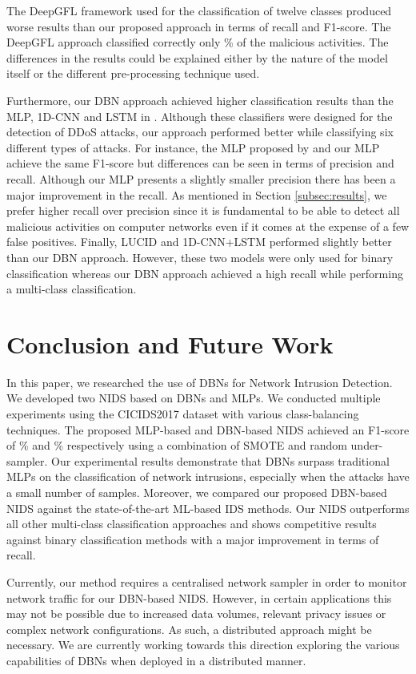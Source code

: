 \documentclass[runningheads]{llncs}
\begin{document}
The DeepGFL \cite{DeepGFL} framework used for the classification of twelve classes produced worse results than our proposed approach in terms of recall and F1-score. The DeepGFL approach classified correctly only \% of the malicious activities. The differences in the results could be explained either by the nature of the model itself or the different pre-processing technique used.

Furthermore, our \ac{DBN} approach achieved higher classification results than the \ac{MLP}, 1D-\ac{CNN} and LSTM in \cite{1D-CNN-LSTM}. Although these classifiers were designed for the detection of \ac{DDoS} attacks, our approach performed better while classifying six different types of attacks. For instance, the \ac{MLP} proposed by \cite{1D-CNN-LSTM} and our \ac{MLP} achieve the same F1-score but differences can be seen in terms of precision and recall. Although our \ac{MLP} presents a slightly smaller precision there has been a major improvement in the recall. As mentioned in Section \ref{subsec:results}, we prefer higher recall over precision since it is fundamental to be able to detect all malicious activities on computer networks even if it comes at the expense of a few false positives.
Finally, LUCID \cite{LUCID} and 1D-\ac{CNN}+LSTM \cite{1D-CNN-LSTM} performed slightly better than our \ac{DBN} approach. However, these two models were only used for binary classification whereas our \ac{DBN} approach achieved a high recall while performing a multi-class classification. \section{Conclusion and Future Work}
\label{sec:conclusion}

In this paper, we researched the use of \acp{DBN} for Network Intrusion Detection. We developed two \ac{NIDS} based on \acp{DBN} and \acp{MLP}. We conducted multiple experiments using the CICIDS2017 dataset with various class-balancing techniques. The proposed \ac{MLP}-based and \ac{DBN}-based \ac{NIDS} achieved an F1-score of \% and \% respectively using a combination of \ac{SMOTE} and random under-sampler. Our experimental results demonstrate that \acp{DBN} surpass traditional \acp{MLP} on the classification of network intrusions, especially when the attacks have a small number of samples. Moreover, we compared our proposed \ac{DBN}-based \ac{NIDS} against the state-of-the-art ML-based IDS methods. Our \ac{NIDS} outperforms all other multi-class classification approaches and shows competitive results against binary classification methods with a major improvement in terms of recall. 

Currently, our method requires a centralised network sampler in order to monitor network traffic for our \ac{DBN}-based \ac{NIDS}. However, in certain applications this may not be possible due to increased data volumes, relevant privacy issues or complex network configurations. As such, a distributed approach might be necessary. We are currently working towards this direction exploring the various capabilities of \acp{DBN} when deployed in a distributed manner. 


\end{document}
